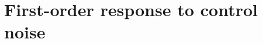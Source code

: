 \documentclass[aps,prx,twocolumn,superscriptaddress,nofootinbib,amsmath,amssymb,floatfix]{revtex4-2}
\begin{document}


\appendix

\section{First-order response to control noise}
\label{app:firstorder}
\end{document}
